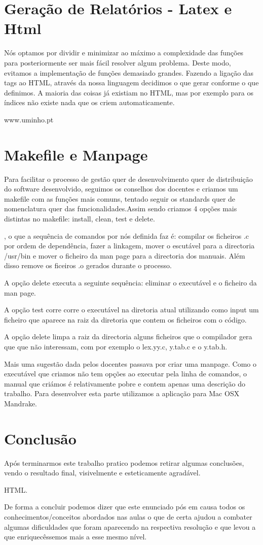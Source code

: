 \documentclass[12pt,letterpaper]{article}
\begin{document}
\newpage
\section{Geração de Relatórios - Latex e Html}
Nós optamos por dividir e minimizar ao máximo a complexidade das funções para posteriormente ser mais fácil resolver algum problema. Deste modo, evitamos a implementação de funções demasiado grandes. Fazendo a ligação das tags ao HTML, através da nossa linguagem decidimos o que gerar conforme o que definimos. A maioria das coisas já existiam no HTML, mas por exemplo para os índices não existe nada que os criem automaticamente. 

www.uminho.pt

\newpage
\section{Makefile e Manpage}
Para facilitar o processo de gestão quer de desenvolvimento quer de distribuição do software desenvolvido, seguimos os conselhos dos docentes e criamos um makefile com as funções mais comuns, tentado seguir os standards quer de nomenclatura quer das funcionalidades.Assim sendo criamos 4 opções mais distintas no makefile: install, clean, test e delete.

, o que a sequência de comandos por nós definida faz é: compilar os ficheiros .c por ordem de dependência, fazer a linkagem, mover o escutável para a directoria /usr/bin e mover o ficheiro da man page para a directoria dos manuais. Além disso remove os ficeiros .o gerados durante o processo.

A opção delete executa a seguinte sequência: eliminar o executável e o ficheiro da man page.

A opção test corre corre o executável na diretoria atual utilizando como input um ficheiro que aparece na raiz da diretoria que contem os ficheiros com o código.

A opção delete limpa a raiz da directoria alguns ficheiros que o compilador gera que que não interessam, com por exemplo o lex.yy.c, y.tab.c e o y.tab.h.

Mais uma sugestão dada pelos docentes passava por criar uma manpage. Como o executável que criamos não tem opções ao executar pela linha de comandos, o manual que criámos é relativamente pobre e contem apenas uma descrição do trabalho. Para desenvolver esta parte utilizamos a aplicação para Mac OSX Mandrake.

\newpage
\section{Conclusão}
Após terminarmos este trabalho pratico podemos retirar algumas conclusões, vendo o resultado final, visivelmente e esteticamente agradável.

HTML.

De forma a concluir podemos dizer que este enunciado pós em causa todos os conhecimentos/conceitos abordados nas aulas o que de certa ajudou a combater algumas dificuldades que foram aparecendo na respectiva resolução e que levou a que enriquecêssemos mais a esse mesmo nível.
\end{document}
